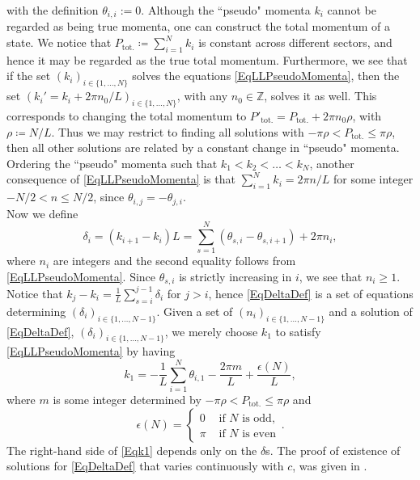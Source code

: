 with the definition $ \theta_{i,i}:=0 $. Although the ``pseudo" momenta $ k_i $ cannot be regarded as being true momenta, one can construct the total momentum of a state. We notice that $ P_{\text{tot.}}\coloneqq\sum_{i=1}^{N}k_i $ is constant across different sectors, and hence it may be regarded as the true total momentum. Furthermore, we see that if the set $ (k_i)_{i\in\{1,\ldots,N\}} $ solves the equations \eqref{EqLLPseudoMomenta}, then the set $ (k_i'=k_i+2\pi n_0 /L)_{i\in\{1,\ldots,N\}} $, with any $n_0\in\mathbb{Z}$, solves it as well. This corresponds to changing the total momentum to $ P'_{\text{tot.}}=P_{\text{tot.}}+ 2\pi n_0 \rho $, with $ \rho\coloneqq N/L $. Thus we may restrict to finding all solutions with $ -\pi \rho <P_{\text{tot.}}\leq \pi \rho $, then all other solutions are related by a constant change in ``pseudo" momenta. Ordering the ``pseudo" momenta such that $ k_1<k_2<\ldots<k_N $, another consequence of \eqref{EqLLPseudoMomenta} is that $ \sum_{i=1}^{N}k_i=2\pi n/L $ for some integer $ -N/2<n\leq N/2 $, since $ \theta_{i,j}=-\theta_{j,i} $.\\
Now we define \begin{equation}\label{EqDeltaDef}
\delta_i=(k_{i+1}-k_i)L=\sum_{s=1}^{N}(\theta_{s,i}-\theta_{s,i+1})+2\pi n_i,
\end{equation} where $ n_i $ are integers and the second equality follows from \eqref{EqLLPseudoMomenta}. Since $ \theta_{s,i} $ is strictly increasing in $ i $, we see that $ n_i\geq 1 $. Notice that $ k_j-k_i=\frac{1}{L}\sum_{s=i}^{j-1}\delta_i $ for $ j>i $, hence \eqref{EqDeltaDef} is a set of equations determining $ (\delta_i)_{i\in\{1,\ldots,N-1\}} $. Given a set of $ (n_i)_{i\in\{1,\ldots,N-1\}} $ and a solution of \eqref{EqDeltaDef}, $ (\delta_i)_{i\in\{1,\ldots,N-1\}} $, we merely choose $ k_1 $ to satisfy \eqref{EqLLPseudoMomenta} by having \begin{equation}\label{Eqk1}
	k_1=-\frac{1}{L}\sum_{i=1}^{N}\theta_{i,1}-\frac{2\pi m}{L}+\frac{\epsilon(N)}{L},
	\end{equation}
	where $ m $ is some integer determined by $ -\pi\rho <P_{\text{tot.}}\leq \pi\rho $ and $$ \epsilon(N)=\begin{cases}
	0&\text{ if } N\text{ is odd},\\
	\pi&\text{ if } N\text{ is even}
	\end{cases}. $$ 
	The right-hand side of \eqref{Eqk1} depends only on the $ \delta $s. The proof of existence of solutions for \eqref{EqDeltaDef} that varies continuously with $ c $, was given in \cite{yang1969thermodynamics}.\\
